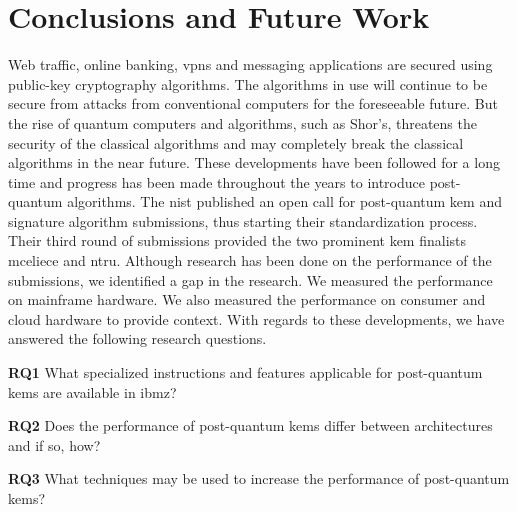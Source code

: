 \chapter{Conclusions and Future Work}
\label{chapter:conclusion}

\noindent Web traffic, online banking, \glspl{vpn} and messaging applications are secured using public-key cryptography algorithms. The algorithms in use will continue to be secure from attacks from conventional computers for the foreseeable future.  But the rise of quantum computers and algorithms, such as Shor's, threatens the security of the classical algorithms and may completely break the classical algorithms in the near future. These developments have been followed for a long time and progress has been made throughout the years to introduce \gls{post-quantum} algorithms. The \acrfull{nist} published an open call for \gls{post-quantum} \gls{kem} and signature algorithm submissions, thus starting their standardization process. Their third round of submissions provided the two prominent \gls{kem} finalists \gls{mceliece} and \gls{ntru}. Although research has been done on the performance of the submissions, we identified a gap in the research. We measured the performance on mainframe hardware. We also measured the performance on consumer and cloud hardware to provide context. With regards to these developments, we have answered the following research questions.

\begin{description}
    \item \textbf{RQ1} What specialized instructions and features applicable for \gls{post-quantum} \acrlong{kem}s are available in \gls{ibmz}?
    
    \item \textbf{RQ2} Does the performance of \gls{post-quantum} \acrlong{kem}s differ between architectures and if so, how?
    
    \item \textbf{RQ3} What techniques may be used to increase the performance of \gls{post-quantum} \acrlong{kem}s?
\end{description}

